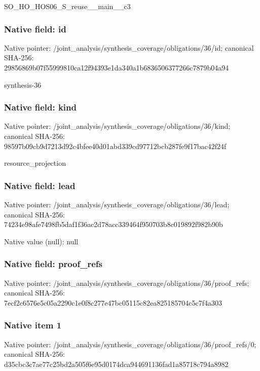 \documentclass[10pt,a4paper]{article}
\begin{document}
\begingroup\raggedright\sloppy SO\_\allowbreak{}HO\_\allowbreak{}HOS06\_\allowbreak{}S\_\allowbreak{}reuse\_\allowbreak{}\_\allowbreak{}main\_\allowbreak{}\_\allowbreak{}c3\par\endgroup

\subsubsection{Native field: id}
Native pointer: /joint\_\allowbreak{}analysis/synthesis\_\allowbreak{}coverage/obligations/36/id; canonical SHA-256: 29856869b07f55999810ca12f94393e1da340a1b6836506377266c7879b04a94

\begingroup\raggedright\sloppy synthesis-36\par\endgroup

\subsubsection{Native field: kind}
Native pointer: /joint\_\allowbreak{}analysis/synthesis\_\allowbreak{}coverage/obligations/36/kind; canonical SHA-256: 98597b09cb9d7213d92c4bfee40d01abd339cd97712bcb287fe9f17bac42f24f

\begingroup\raggedright\sloppy resource\_\allowbreak{}projection\par\endgroup

\subsubsection{Native field: lead}
Native pointer: /joint\_\allowbreak{}analysis/synthesis\_\allowbreak{}coverage/obligations/36/lead; canonical SHA-256: 74234e98afe7498fb5daf1f36ac2d78acc339464f950703b8c019892f982b90b

Native value (null): null

\subsubsection{Native field: proof\_\allowbreak{}refs}
Native pointer: /joint\_\allowbreak{}analysis/synthesis\_\allowbreak{}coverage/obligations/36/proof\_\allowbreak{}refs; canonical SHA-256: 7ecf2c6576e5c05a2290c1e0f8c277e47bc05115c82ea825185704c5c7f4a303

\subsubsection{Native item 1}
Native pointer: /joint\_\allowbreak{}analysis/synthesis\_\allowbreak{}coverage/obligations/36/proof\_\allowbreak{}refs/0; canonical SHA-256: d35cbc3c7ae77c25bd2a505f6e95d0174dca944691136fad1a85718c794a8982
\end{document}
